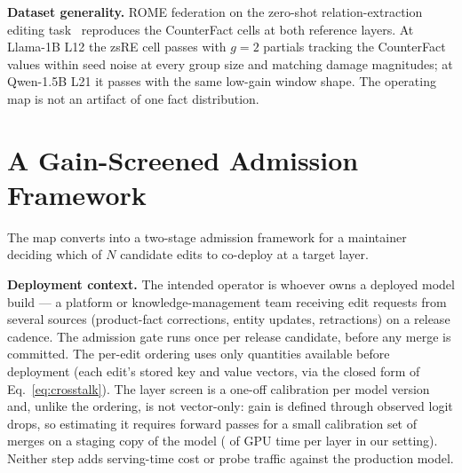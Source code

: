 \documentclass[preprint,12pt]{elsarticle}
\theoremstyle{definition}
\begin{document}
\textbf{Dataset generality.} ROME federation on the zero-shot relation-extraction editing
task~\cite{decao2021} reproduces the CounterFact cells at both reference layers. At
Llama-1B L12 the zsRE cell passes with $g{=}2$ partials \zsrePartialsGtwo{}
tracking the CounterFact values \cfPartialsGtwoForZsre{} within seed noise at every group
size and matching damage magnitudes; at Qwen-1.5B L21 it passes with the same low-gain window
shape. The operating map is not an artifact of one fact distribution.

\section{A Gain-Screened Admission Framework}\label{sec:rule}
The map converts into a two-stage admission framework for a maintainer deciding which of $N$
candidate edits to co-deploy at a target layer.

\textbf{Deployment context.} The intended operator is whoever owns a deployed model
build --- a platform or knowledge-management team receiving edit requests from several
sources (product-fact corrections, entity updates, retractions) on a release cadence.
The admission gate runs once per release candidate, before any merge is committed. The
per-edit ordering uses only quantities available before deployment (each edit's stored
key and value vectors, via the closed form of Eq.~\ref{eq:crosstalk}). The layer screen
is a one-off calibration per model version and, unlike the ordering, is not vector-only:
gain is defined through observed logit drops, so estimating it requires forward passes
for a small calibration set of merges on a staging copy of the model
(\calibTime{} of GPU time per layer in our setting). Neither step adds serving-time cost
or probe traffic against the production model.
\end{document}
